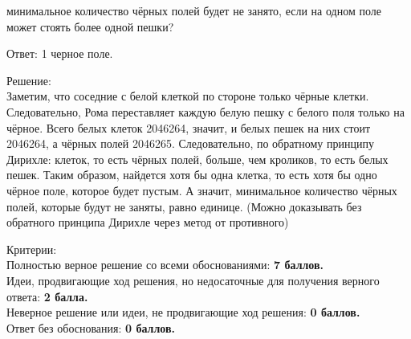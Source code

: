\newpage
\hspace{3mm}

 минимальное количество чёрных полей будет не занято, если на одном поле может стоять более одной пешки?

\hspace{3mm}

Ответ: 1 черное поле.

Решение:\\
Заметим, что соседние с белой клеткой по стороне только чёрные клетки. Следовательно, Рома переставляет каждую белую пешку с белого поля только на чёрное. Всего белых клеток 2046264, значит, и белых пешек на них стоит 2046264, а чёрных полей 2046265. Следовательно, по обратному принципу Дирихле: клеток, то есть чёрных полей, больше, чем кроликов, то есть белых пешек. Таким образом, найдется хотя бы одна клетка, то есть хотя бы одно чёрное поле, которое будет пустым. А значит, минимальное количество чёрных полей, которые будут не заняты, равно единице. (Можно доказывать без обратного принципа Дирихле через метод от противного)


\hspace{3mm}

Критерии:\\
Полностью верное решение со всеми обоснованиями: \textbf{7 баллов.}\\
Идеи, продвигающие ход решения, но недосаточные для получения верного ответа: \textbf{2 балла.}\\
Неверное решение или идеи, не продвигающие ход решения: \textbf{0 баллов.}\\
Ответ без обоснования: \textbf{0 баллов.}

